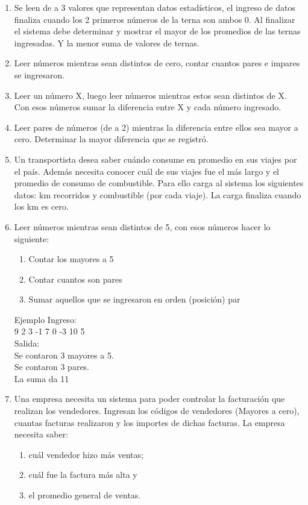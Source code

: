 \begin{enumerate}[resume]
	\item Se leen de a 3 valores que representan datos estadísticos, el ingreso de datos finaliza cuando los 2 primeros números de la  terna son ambos 0. Al finalizar el sistema debe determinar y mostrar el mayor de los promedios de las ternas ingresadas. Y la menor suma de valores de ternas.    
	
	\item Leer números mientras sean distintos de cero, contar cuantos pares e impares se ingresaron.
 
    \item Leer un número X, luego leer números mientras estos sean distintos de X. Con esos números sumar la diferencia entre X y cada número ingresado.
 
	\item Leer pares de números (de a 2) mientras la diferencia entre ellos sea mayor a cero. Determinar la mayor diferencia que se registró.
  
    \item Un transportista desea saber cuándo consume en promedio en sus viajes por el país. Además necesita conocer cuál de sus  viajes fue el más largo y el promedio de consumo de combustible. Para ello carga al sistema los siguientes datos: km recorridos y  combustible (por cada viaje). La carga finaliza cuando los km es cero.
  	
	\item Leer números mientras sean distintos de 5, con esos números hacer lo siguiente:
	\begin{enumerate}
  		\item Contar los mayores a 5
		\item Contar cuantos son pares
		\item Sumar aquellos que se ingresaron en orden (posición) par
	\end{enumerate}
 
   Ejemplo Ingreso: \\
                  9       2       3       -1      7       0       -3      10     5 \\
         Salida: \\
                   Se contaron 3 mayores a 5. \\
                   Se contaron 3 pares. \\
                   La suma da 11 \\

 
   \item Una empresa necesita un sistema para poder controlar la facturación que realizan los vendedores. 
		Ingresan los códigos de vendedores (Mayores a cero), cuantas facturas realizaron y los importes de dichas facturas. 
		La empresa necesita saber: 
		\begin{enumerate}
			\item cuál vendedor hizo más ventas; 
			\item cuál fue la factura más alta y 
			\item el promedio general de ventas.
		\end{enumerate}


\end{enumerate}
